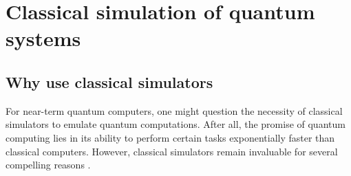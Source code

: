 \section{Classical simulation of quantum systems\label{sec:ClassicalSimulationOfQSystems}}

\subsection{Why use classical simulators}

For near-term quantum computers, one might question the necessity of classical simulators to emulate quantum computations. After all, the promise of quantum computing lies in its ability to perform certain tasks exponentially faster than classical computers. However, classical simulators remain invaluable for several compelling reasons \cite{10.1038/s41598-019-47174-9, 9910084,doi.org/10.48550,Fedorov2022unitaryselective,preopt-0,preopt-1,preopt-2,IBMQuantumSummit2023}.

